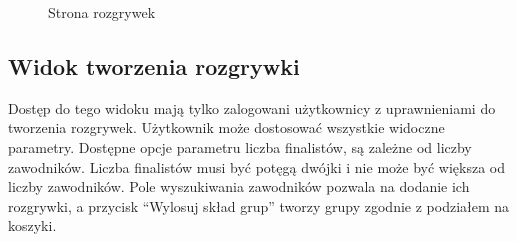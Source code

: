 \documentclass[shortabstract]{iithesis}
\begin{document}
\begin{figure}[H]
    \centering
    \hfill
    \caption{Strona rozgrywek}
\end{figure}

\newpage
\subsection{Widok tworzenia rozgrywki}
Dostęp do tego widoku mają tylko zalogowani użytkownicy z uprawnieniami do tworzenia rozgrywek.
Użytkownik może dostosować wszystkie widoczne parametry. Dostępne opcje parametru liczba finalistów, są zależne od liczby zawodników.
Liczba finalistów musi być potęgą dwójki i nie może być większa od liczby zawodników.
Pole wyszukiwania zawodników pozwala na dodanie ich rozgrywki, a przycisk ``Wylosuj skład grup'' tworzy grupy zgodnie z podziałem na koszyki.
\end{document}
